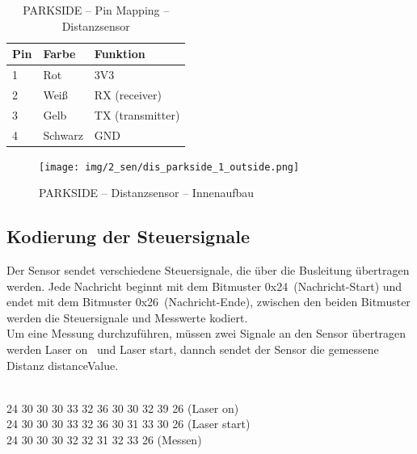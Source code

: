 \pagebreak[1]
\begin{table}[ht]
	\centering
	\caption{PARKSIDE – Pin Mapping – Distanzsensor}
	\label{parkside:pinmapping}
	\begin{tabular}{l|ll}
		\hline
		\textbf{Pin} & \textbf{Farbe} & \textbf{Funktion} \\ \hline
		1            & Rot            & 3V3               \\
		2            & Weiß           & RX (receiver)     \\
		3            & Gelb           & TX (transmitter)  \\
		4            & Schwarz        & GND               \\ \hline
	\end{tabular}
\end{table}
\pagebreak[1]

\pagebreak[1]
\begin{figure}[ht]
	\begin{center}
		\texttt{[image: img/2\_sen/dis\_parkside\_1\_outside.png]}
		\caption{PARKSIDE – Distanzsensor – Innenaufbau}
		\label{img_2_2:sen_dis_parkside:1}
	\end{center}
\end{figure}
\pagebreak[4]

\subsection{Kodierung der Steuersignale}
\label{Distanzmessung:Kodierung}
Der Sensor sendet verschiedene Steuersignale, die über die Busleitung übertragen werden. Jede Nachricht beginnt mit dem Bitmuster \frqq 0x24\flqq\ (Nachricht-Start) und endet mit dem Bitmuster \frqq 0x26\flqq\ (Nachricht-Ende), zwischen den beiden Bitmuster werden die Steuersignale und Messwerte kodiert.\\
Um eine Messung durchzuführen, müssen zwei Signale an den Sensor übertragen werden \frqq Laser on \flqq\ und \frqq Laser start\flqq, dannch sendet der Sensor die gemessene Distanz \frqq distanceValue\flqq.\\
\\
\begin{center}
	24 30 30 30 33 32 36 30 30 32 39 26 (Laser on)\\
	24 30 30 30 33 32 36 30 31 33 30 26 (Laser start)\\
	24 30 30 30 32 32 31 32 33 26 (Messen)\\
\end{center}

